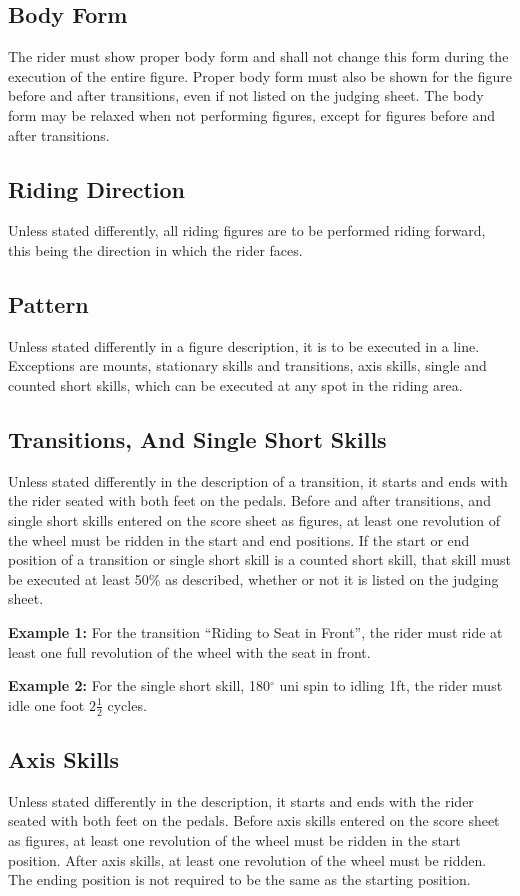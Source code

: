 \subsection{Body Form}
The rider must show proper body form and shall not change this form during the execution of the entire figure.
Proper body form must also be shown for the figure before and after transitions, even if not listed on the judging sheet.
The body form may be relaxed when not performing figures, except for figures before and after transitions.

\subsection{Riding Direction}
Unless stated differently, all riding figures are to be performed riding forward, this being the direction in which the rider faces.

\subsection{Pattern}
Unless stated differently in a figure description, it is to be executed in a line.
Exceptions are mounts, stationary skills and transitions, axis skills, single and counted short skills, which can be executed at any spot in the riding area.

\subsection{Transitions, And Single Short Skills}
Unless stated differently in the description of a transition, it starts and ends with the rider seated with both feet on the pedals.
Before and after transitions, and single short skills entered on the score sheet as figures, at least one revolution of the wheel must be ridden in the start and end positions.
If the start or end position of a transition or single short skill is a counted short skill, that skill must be executed at least 50\% as described, whether or not it is listed on the judging sheet.

\textbf{Example 1:} For the transition ``Riding to Seat in Front'', the rider must ride at least one full revolution of the wheel with the seat in front.

\textbf{Example 2:} For the single short skill, 180$^\circ$ uni spin to idling 1ft, the rider must idle one foot $2 \frac{1}{2}$ cycles.

\subsection{Axis Skills}
Unless stated differently in the description, it starts and ends with the rider seated with both feet on the pedals.
Before axis skills entered on the score sheet as figures, at least one revolution of the wheel must be ridden in the start position.
After axis skills, at least one revolution of the wheel must be ridden.
The ending position is not required to be the same as the starting position.

